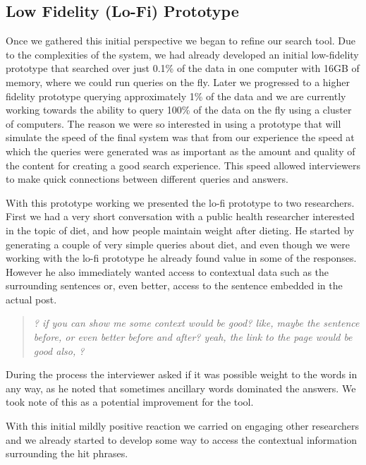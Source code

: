 \documentclass{sigchi}
\begin{document}
\subsection{Low Fidelity (Lo-Fi) Prototype}
Once we gathered this initial perspective we began to refine our search tool. Due to the complexities of the system, we had already developed an initial low-fidelity prototype that searched over just 0.1\% of the data in one computer with 16GB of memory, where we could run queries on the fly. Later we progressed to a higher fidelity prototype querying approximately 1\% of the data and we are currently working towards the ability to query 100\% of the data on the fly using a cluster of computers. The reason we were so interested in using a prototype that will simulate the speed of the final system was that from our experience the speed at which the queries were generated was as important as the amount and quality of the content for creating a good search experience. This speed allowed interviewers to make quick connections between different queries and answers.

With this prototype working we presented the lo-fi prototype to two researchers. First we had a very short conversation with a public health researcher interested in the topic of diet, and how people maintain weight after dieting. He started by generating a couple of very simple queries about diet, and even though we were working with the lo-fi prototype he already found value in some of the responses. However he also immediately wanted access to contextual data such as the surrounding sentences or, even better, access to the sentence embedded in the actual post. 

\begin{quote}
{\em
? if you can show me some context would be good? like, maybe the sentence before, or even better before and after? yeah, the link to the page would be good also, ?
}\end{quote}


During the process the interviewer asked if it was possible weight to the words in any way, as he noted that sometimes ancillary words dominated the answers. We took note of this as a potential improvement for the tool.

With this initial mildly positive reaction we carried on engaging other researchers and we already started to develop some way to access the contextual information surrounding the hit phrases. 

\end{document}
